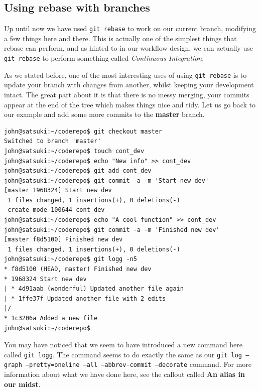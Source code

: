 \subsection{Using rebase with branches}

Up until now we have used \texttt{git rebase} to work on our current branch, modifying a few things here and there.  This is actually one of the simplest things that rebase can perform, and as hinted to in our workflow design, we can actually use \texttt{git rebase} to perform something called \emph{Continuous Integration}.

As we stated before, one of the most interesting uses of using \texttt{git rebase} is to update your branch with changes from another, whilst keeping your development intact.  The great part about it is that there is no messy merging, your commits appear at the end of the tree which makes things nice and tidy.  Let us go back to our example and add some more commits to the \textbf{master} branch.

\begin{Verbatim}
john@satsuki:~/coderepo$ git checkout master
Switched to branch 'master'
john@satsuki:~/coderepo$ touch cont_dev
john@satsuki:~/coderepo$ echo "New info" >> cont_dev 
john@satsuki:~/coderepo$ git add cont_dev
john@satsuki:~/coderepo$ git commit -a -m 'Start new dev'
[master 1968324] Start new dev
 1 files changed, 1 insertions(+), 0 deletions(-)
 create mode 100644 cont_dev
john@satsuki:~/coderepo$ echo "A cool function" >> cont_dev 
john@satsuki:~/coderepo$ git commit -a -m 'Finished new dev'
[master f8d5100] Finished new dev
 1 files changed, 1 insertions(+), 0 deletions(-)
john@satsuki:~/coderepo$ git logg -n5
* f8d5100 (HEAD, master) Finished new dev
* 1968324 Start new dev
| * 4d91aab (wonderful) Updated another file again
| * 1ffe37f Updated another file with 2 edits
|/  
* 1c3206a Added a new file
john@satsuki:~/coderepo$ 
\end{Verbatim}

You may have noticed that we seem to have introduced a new command here called \texttt{git logg}.  The command seems to do exactly the same as our \texttt{git log --graph --pretty=oneline --all --abbrev-commit --decorate} command.  For more information about what we have done here, see the callout called \textbf{An alias in our midst}.

